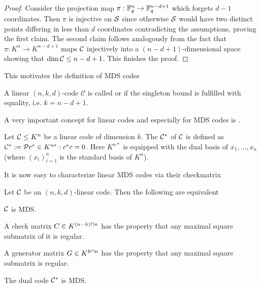 \begin{proof}
    Consider the projection map $\pi:\mathbb{F}_{q}^n\rightarrow\mathbb{F}_{q}^{n-d+1}$ which forgets $d-1$ coordinates.
    Then $\pi$ is injective on $\mathcal{S}$ since otherwise $\mathcal{S}$ would have two distinct points differing in less than $d$ coordinates contradicting the assumptions, proving the first claim.
    The second claim follows analogously from the fact that $\pi:K^n\to K^{n-d+1}$ maps $\mathcal{C}$ injectively into a $(n-d+1)$-dimensional space showing that $\dim{\mathcal{C}}\leq n-d+1$.
    This finishes the proof.
\end{proof}

This motivates the definition of MDS codes

\begin{definition}
    A linear $(n,k,d)$-code $\mathcal{C}$ is called  or  if the singleton bound is fulfilled with equality, i.e. $k=n-d+1$. 
\end{definition}

A very important concept for linear codes and especially for MDS codes is .

\begin{definition}\label{lincode-dual}
    Let $\mathcal{C}\leq K^n$ be a linear code of dimension $k$. The  $\mathcal{C}^{\ast}$ of $\mathcal{C}$ is defined as $\dual\cC:=\set{c^{\ast}\in K^{n\ast}:c^{\ast}c=0}$. Here $K^{n\ast}$ is equipped with the dual basis of $x_1,\ldots,x_n$ (where ${(x_i)}_{i=1}^n$ is the standard basis of $K^n$).
\end{definition}

It is now easy to characterize linear MDS codes via their checkmatrix

\begin{lemma}\label{mdschar}
    Let $\mathcal{C}$ be an $(n,k,d)$-linear code. Then the following are equivalent
    \begin{statements}
            \item\label{mds} $\mathcal{C}$ is MDS.
            \item\label{mds-chkmtrx} A check matrix $C \in K^{(n-k)\setprod n}$ has the property that any maximal square submatrix of it is regular.
            \item\label{mds-gmtrx} A generator matrix $G \in K^{k\setprod n}$ has the property that any maximal square submatrix is regular.
            \item\label{mds-dual} The dual code $\mathcal{C}^{\ast}$ is MDS.
    \end{statements}
\end{lemma}

